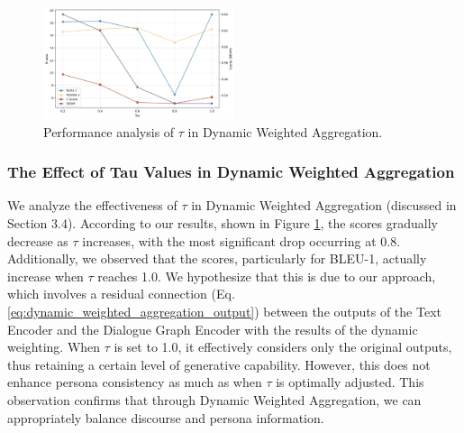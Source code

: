 \documentclass[letterpaper]{article} %
\begin{document}
\begin{figure}[h]
    \centering
    \includegraphics[width=0.5\textwidth]{./images/effectiveness_of_tau_with_deam.png}
    \caption{Performance analysis of $\tau$ in Dynamic Weighted Aggregation.}
    \label{fig:effectiveness_of_tau}
\end{figure}

\subsubsection{The Effect of Tau Values in Dynamic Weighted Aggregation}

We analyze the effectiveness of $\tau$ in Dynamic Weighted Aggregation (discussed in Section 3.4). According to our results, shown in Figure \ref{fig:effectiveness_of_tau}, the scores gradually decrease as $\tau$ increases, with the most significant drop occurring at 0.8. Additionally, we observed that the scores, particularly for BLEU-1, actually increase when $\tau$ reaches 1.0. We hypothesize that this is due to our approach, which involves a residual connection (Eq. \ref{eq:dynamic_weighted_aggregation_output}) between the outputs of the Text Encoder and the Dialogue Graph Encoder with the results of the dynamic weighting. When $\tau$ is set to 1.0, it effectively considers only the original outputs, thus retaining a certain level of generative capability. However, this does not enhance persona consistency as much as when $\tau$ is optimally adjusted. This observation confirms that through Dynamic Weighted Aggregation, we can appropriately balance discourse and persona information.
\end{document}
